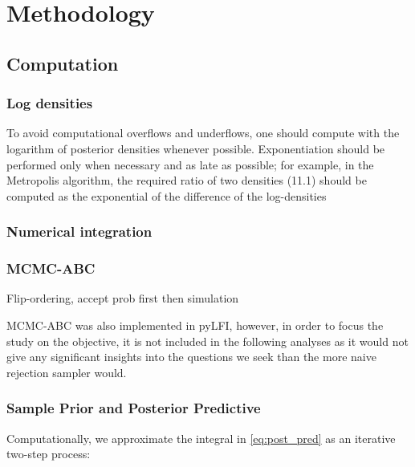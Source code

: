 \chapter{Methodology}\label{chap:methodology}

\section{Computation}

\subsection{Log densities}

To avoid computational overflows and underflows, one should compute with the logarithm of posterior densities whenever possible. Exponentiation should be performed only when necessary and as late as possible; for example, in the Metropolis algorithm, the required ratio of two densities (11.1) should be computed as the exponential of the difference of the log-densities \cite[p. 261]{BDA}

\subsection{Numerical integration} 


\subsection{MCMC-ABC}

Flip-ordering, accept prob first then simulation

MCMC-ABC was also implemented in pyLFI, however, in order to focus the study on the objective, it is not included in the following analyses as it would not give any significant insights into the questions we seek than the more naive rejection sampler would. 

\subsection{Sample Prior and Posterior Predictive} 

Computationally, we approximate the integral in \autoref{eq:post_pred} as an iterative two-step process: 


